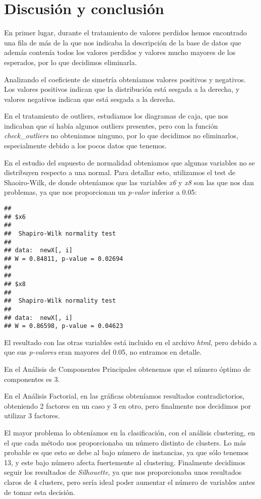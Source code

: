 \documentclass[11pt,a4paper]{article}
\begin{document}
\section{Discusión y conclusión}

En primer lugar, durante el tratamiento de valores perdidos hemos encontrado una fila de más de la que nos indicaba la descripción de la base de datos que además contenía todos los valores perdidos y valores mucho mayores de los esperados, por lo que decidimos eliminarla.

Analizando el coeficiente de simetría obteníamos valores positivos y negativos. Los valores positivos indican que la distribución está sesgada a la derecha, y valores negativos indican que está sesgada a la derecha.

En el tratamiento de outliers, estudiamos los diagramas de caja, que nos indicaban que sí había algunos outliers presentes, pero con la función \emph{check\_outliers} no obteniamos ninguno, por lo que decidimos no eliminarlos, especialmente debido a los pocos datos que tenemos.

En el estudio del supuesto de normalidad obteniamos que algunas variables no se distribuyen respecto a una normal. Para detallar esto, utilizamos el test de Shaoiro-Wilk, de donde obteníamos que las variables \emph{x6} y \emph{x8} son las que nos dan problemas, ya que nos proporcionan un \emph{p-valor} inferior a 0.05:
\begin{verbatim}
## 
## $x6
## 
##  Shapiro-Wilk normality test
## 
## data:  newX[, i]
## W = 0.84811, p-value = 0.02694
## 
## 
## $x8
## 
##  Shapiro-Wilk normality test
## 
## data:  newX[, i]
## W = 0.86598, p-value = 0.04623
\end{verbatim}
El resultado con las otras variables está incluido en el archivo \emph{html}, pero debido a que sus \emph{p-valores} eran mayores del 0.05, no entramos en detalle.

En el Análisis de Componentes Principales obtenemos que el número óptimo de componentes es 3.

En el Análisis Factorial, en las gráficas obteníamos resultados contradictorios, obteniendo 2 factores en un caso y 3 en otro, pero finalmente nos decidimos por utilizar 3 factores.

El mayor problema lo obteníamos en la clasificación, con el análisis clustering, en el que cada método nos proporcionaba un número distinto de clusters. Lo más probable es que esto se debe al bajo número de instancias, ya que sólo tenemos 13, y este bajo número afecta fuertemente al clustering. Finalmente decidimos seguir los resultados de \emph{Silhouette}, ya que nos proporcionaba unos resultados claros de 4 clusters, pero sería ideal poder aumentar el número de variables antes de tomar esta decisión.
\end{document}
